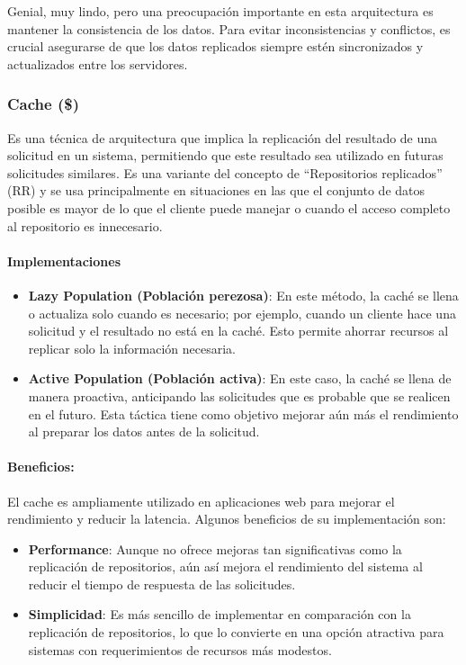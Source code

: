 \documentclass{article}
\begin{document}
		Genial, muy lindo, pero una preocupación importante en esta arquitectura es mantener la consistencia de los datos. Para evitar inconsistencias y conflictos, es crucial asegurarse de que los datos replicados siempre estén sincronizados y actualizados entre los servidores.
		
		\subsubsection{Cache (\$)}
		 Es una técnica de arquitectura que implica la replicación del resultado de una solicitud en un sistema, permitiendo que este resultado sea utilizado en futuras solicitudes similares. Es una variante del concepto de ``Repositorios replicados'' (RR) y se usa principalmente en situaciones en las que el conjunto de datos posible es mayor de lo que el cliente puede manejar o cuando el acceso completo al repositorio es innecesario.
 		\paragraph{Implementaciones}
		 
 		\begin{itemize}	
		 	\item {\textbf{Lazy Population (Población perezosa)}}: En este método, la caché se llena o actualiza solo cuando es necesario; por ejemplo, cuando un cliente hace una solicitud y el resultado no está en la caché. Esto permite ahorrar recursos al replicar solo la información necesaria.
		 	\item {\textbf{Active Population (Población activa)}}: En este caso, la caché se llena de manera proactiva, anticipando las solicitudes que es probable que se realicen en el futuro. Esta táctica tiene como objetivo mejorar aún más el rendimiento al preparar los datos antes de la solicitud.
		 \end{itemize}
		 
		 
		 \paragraph{Beneficios:}		 
			El cache es ampliamente utilizado en aplicaciones web para mejorar el rendimiento y reducir la latencia. Algunos beneficios de su implementación son:


		 
		 \begin{itemize}	
		 	\item {\textbf{Performance}}: Aunque no ofrece mejoras tan significativas como la replicación de repositorios, aún así mejora el rendimiento del sistema al reducir el tiempo de respuesta de las solicitudes.
		 	
		 	\item {\textbf{Simplicidad}}: Es más sencillo de implementar en comparación con la replicación de repositorios, lo que lo convierte en una opción atractiva para sistemas con requerimientos de recursos más modestos.
		 	
		 \end{itemize}
		 
\end{document}

